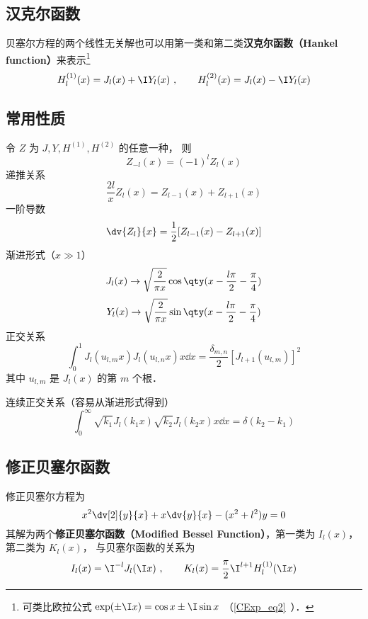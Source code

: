 \subsection{汉克尔函数}
贝塞尔方程的两个线性无关解也可以用第一类和第二类\textbf{汉克尔函数（Hankel function）}来表示\footnote{可类比欧拉公式 $\exp(\pm\I x) = \cos x \pm \I\sin x$ （\autoref{CExp_eq2}~）．}
\begin{equation}
H_l ^{(1)}(x) = J_l(x) + \I Y_l(x)~,
\qquad
H_l ^{(2)}(x) = J_l(x) - \I Y_l(x)
\end{equation}

\subsection{常用性质}
令 $Z$ 为 $J, Y, H^{(1)}, H^{(2)}$ 的任意一种， 则
\begin{equation}
Z_{-l}(x) = (-1)^l Z_l(x)
\end{equation}
递推关系
\begin{equation}
\frac{2l}{x} Z_l(x) = Z_{l -1}(x) + Z_{l+1}(x)
\end{equation}
一阶导数
\begin{equation}
\dv{Z_l}{x} = \frac12 [Z_{l  - 1}(x) - Z_{l +1}(x)]
\end{equation}
渐进形式（$x \gg 1$）
\begin{equation}
J_l(x) \to \sqrt{\frac{2}{\pi x}} \cos\qty(x - \frac{l\pi}{2} - \frac{\pi}{4})
\end{equation}
\begin{equation}
Y_l(x) \to \sqrt{\frac{2}{\pi x}} \sin\qty(x - \frac{l\pi}{2} - \frac{\pi}{4})
\end{equation}
正交关系
\begin{equation}
\int_0^1 J_l (u_{l ,m} x) J_l (u_{l ,n} x) x \dd{x} = \frac{\delta_{m,n}}{2}[J_{l + 1} (u_{l ,m})]^2
\end{equation}
其中 $u_{l, m}$ 是 $J_l(x)$ 的第 $m$ 个根．

连续正交关系（容易从渐进形式得到）
\begin{equation}
\int_0^\infty \sqrt{k_1} J_l (k_1 x) \sqrt{k_2}J_l (k_2 x) x \dd{x} = \delta(k_2 - k_1)
\end{equation}

\subsection{修正贝塞尔函数}
修正贝塞尔方程为
\begin{equation}
x^2 \dv[2]{y}{x} + x \dv{y}{x} - (x^2 + l ^2)y = 0
\end{equation}
其解为两个\textbf{修正贝塞尔函数（Modified Bessel Function）}，第一类为 $I_l(x)$，  第二类为 $K_l(x)$，  与贝塞尔函数的关系为
\begin{equation}\label{Bessel_eq2}
I_l(x) = \I^{-l} J_l(\I x)~,
\qquad
K_l(x) = \frac{\pi}{2} \I^{l  + 1} H_l ^{(1)}(\I x)
\end{equation}

